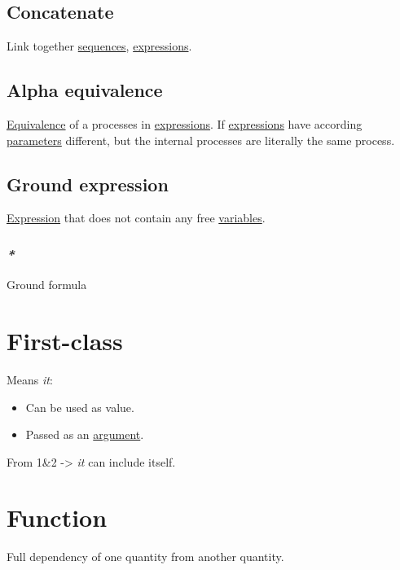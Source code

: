 \documentclass[a4paper,14pt,oneside]{book}
\begin{document}
\section{\label{orgd7dcd9b}Concatenate}
\label{sec:orga955171}
Link together \hyperref[org337fd10]{sequences}, \hyperref[orgae6a816]{expressions}.\\

\section{\label{org2e1805c}Alpha equivalence}
\label{sec:org986c9e0}
\hyperref[org841678d]{Equivalence} of a processes in \hyperref[orgae6a816]{expressions}. If \hyperref[orgae6a816]{expressions} have according \hyperref[orgf6e4038]{parameters} different, but the internal processes are literally the same process.\\

\section{\label{org65102a4}Ground expression}
\label{sec:orgbdec4b0}
\hyperref[org3ea9088]{Expression} that does not contain any free \hyperref[org329012b]{variables}.\\

\subsection{\emph{*}}
\label{sec:org6d43a3b}

\label{org1cfb997}Ground formula\\

\chapter{\label{orgb8d89c3}First-class}
\label{sec:orgcbb9489}
Means \emph{it}:\\
\begin{itemize}
\item Can be used as value.\\
\item Passed as an \hyperref[org9e788a4]{argument}.\\
\end{itemize}
From 1\&2 -> \emph{it} can include itself.\\

\chapter{\label{orge00b05b}Function}
\label{sec:org0dae177}
Full dependency of one quantity from another quantity.\\
\end{document}
